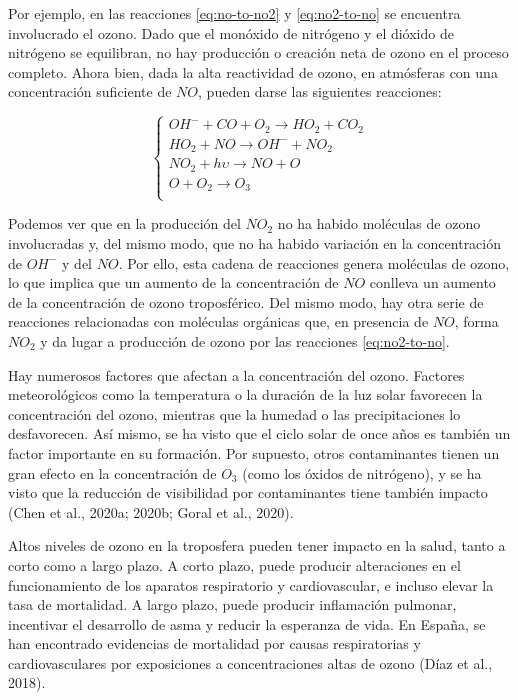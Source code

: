 \documentclass[12pt]{article}
\begin{document}
Por ejemplo, en las reacciones \ref{eq:no-to-no2} y \ref{eq:no2-to-no} se encuentra involucrado el ozono. Dado que el monóxido de nitrógeno y el dióxido de nitrógeno se equilibran, no hay producción o creación neta de ozono en el proceso completo. Ahora bien, dada la alta reactividad de ozono, en atmósferas con una concentración suficiente de $NO$, pueden darse las siguientes reacciones:

\begin{equation}
\begin{cases}
OH^{-} + CO + O_{2} \rightarrow HO_{2} + CO_{2} \\
HO_{2} + NO \rightarrow OH^{-} + NO_{2} \\
NO_{2} + h\upsilon \rightarrow NO + O \\
O + O_{2} \rightarrow O_{3} \\
\end{cases}
\end{equation}

Podemos ver que en la producción del $NO_{2}$ no ha habido moléculas de ozono involucradas y, del mismo modo, que no ha habido variación en la concentración de $OH^{-}$ y del $NO$. Por ello, esta cadena de reacciones genera moléculas de ozono, lo que implica que un aumento de la concentración de $NO$ conlleva un aumento de la concentración de ozono troposférico. Del mismo modo, hay otra serie de reacciones relacionadas con moléculas orgánicas que, en presencia de $NO$, forma $NO_{2}$ y da lugar a producción de ozono por las reacciones \ref{eq:no2-to-no}.

Hay numerosos factores que afectan a la concentración del ozono. Factores meteorológicos como la temperatura o la duración de la luz solar favorecen la concentración del ozono, mientras que la humedad o las precipitaciones lo desfavorecen. Así mismo, se ha visto que el ciclo solar de once años es también un factor importante en su formación. Por supuesto, otros contaminantes tienen un gran efecto en la concentración de $O_{3}$ (como los óxidos de nitrógeno), y se ha visto que la reducción de visibilidad por contaminantes tiene también impacto (Chen et al., 2020a; 2020b; Goral et al., 2020).

Altos niveles de ozono en la troposfera pueden tener impacto en la salud, tanto a corto como a largo plazo. A corto plazo, puede producir alteraciones en el funcionamiento de los aparatos respiratorio y cardiovascular, e incluso elevar la tasa de mortalidad. A largo plazo, puede producir inflamación pulmonar, incentivar el desarrollo de asma y reducir la esperanza de vida. En España, se han encontrado evidencias de mortalidad por causas respiratorias y cardiovasculares por exposiciones a concentraciones altas de ozono (Díaz et al., 2018).
\end{document}
